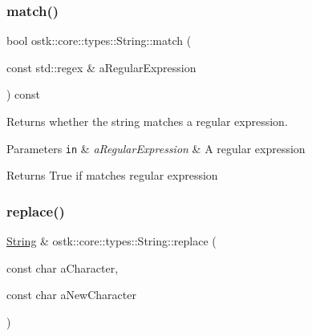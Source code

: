 \subsubsection{\texorpdfstring{match()}{match()}}
{\footnotesize\ttfamily bool ostk\+::core\+::types\+::\+String\+::match (\begin{DoxyParamCaption}\item[{const std\+::regex \&}]{a\+Regular\+Expression }\end{DoxyParamCaption}) const}



Returns whether the string matches a regular expression. 





\begin{DoxyParams}[1]{Parameters}
\mbox{\tt in}  & {\em a\+Regular\+Expression} & A regular expression \\
\hline
\end{DoxyParams}
\begin{DoxyReturn}{Returns}
True if matches regular expression 
\end{DoxyReturn}
\mbox{\label{classostk_1_1core_1_1types_1_1_string_a69b7f8a58ee5a55636b0dfd5d8b85e2c}} 
\subsubsection{\texorpdfstring{replace()}{replace()}\hspace{0.1cm}{\footnotesize\ttfamily [1/2]}}
{\footnotesize\ttfamily \hyperlink{classostk_1_1core_1_1types_1_1_string}{String} \& ostk\+::core\+::types\+::\+String\+::replace (\begin{DoxyParamCaption}\item[{const char}]{a\+Character,  }\item[{const char}]{a\+New\+Character }\end{DoxyParamCaption})}



